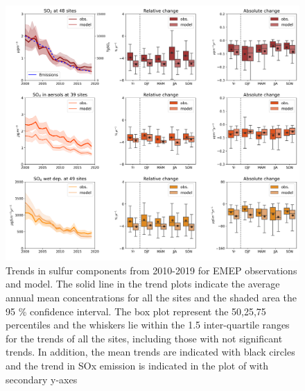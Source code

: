 \begin{figure}[h]
	\centering
	\includegraphics[width=0.74\paperwidth]{FIGS_TRENDS/sulfur_trends.png}
	\caption{\label{fig:SOx_trends}Trends in sulfur components from 2010-2019 for EMEP observations and model. The solid line in the trend plots indicate the average annual mean concentrations for all the sites and the shaded area the 95 \% confidence interval. The box plot represent the 50,25,75 percentiles and the whiskers lie within the 1.5 inter-quartile ranges for the trends of all the sites, including those with not significant trends. In addition, the mean trends are indicated with black circles and the trend in SOx emission is indicated in the plot of \soii with secondary y-axes}
\end{figure}

